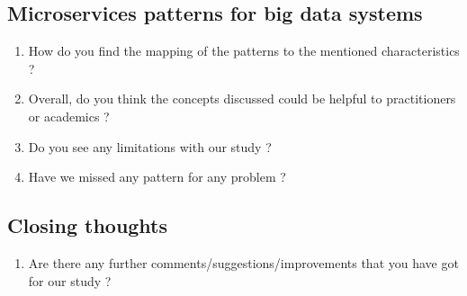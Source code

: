\documentclass{bmcart}
\begin{document}
\begin{backmatter}
\subsection*{\textbf{Microservices patterns for big data systems}}

\begin{enumerate}
    \item How do you find the mapping of the patterns to the mentioned characteristics ? 
    \item Overall, do you think the concepts discussed could be helpful to practitioners or academics ?  
    \item Do you see any limitations with our study ? 
    \item Have we missed any pattern for any problem ?
\end{enumerate}

\subsection*{\textbf{Closing thoughts}}

\begin{enumerate}
    \item Are there any further comments/suggestions/improvements that you have got for our study ?
\end{enumerate}







\end{backmatter}
\end{document}

